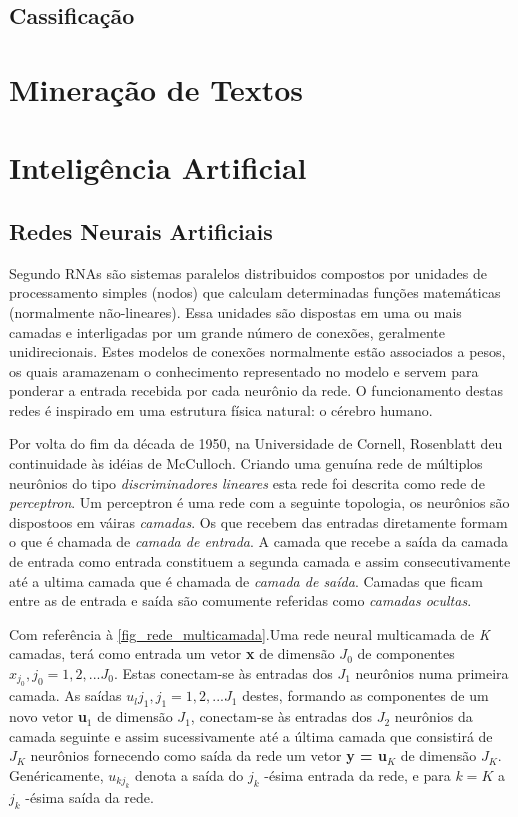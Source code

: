 \documentclass[
	12pt,				%
	openright,			%
	twoside,			%
	a4paper,			%
	english,			%
	french,				%
	spanish,			%
	brazil				%
	]{abntex2}
\begin{document}
\subsection{Cassificação}
\section{Mineração de Textos}
\section{Inteligência Artificial}
\subsection{Redes Neurais Artificiais}
Segundo  RNAs são sistemas paralelos distribuidos compostos por unidades de processamento simples (nodos) que calculam determinadas funções matemáticas (normalmente não-lineares). Essa unidades são dispostas em uma ou mais camadas e interligadas por um grande número de conexões, geralmente unidirecionais. Estes modelos de conexões normalmente estão associados a pesos, os quais aramazenam o conhecimento representado no modelo e servem para ponderar a entrada recebida por cada neurônio da rede. O funcionamento destas redes é inspirado em uma estrutura física natural: o cérebro humano.

Por volta do fim da década de 1950, na Universidade de Cornell, Rosenblatt deu continuidade às idéias de McCulloch. Criando uma genuína rede de múltiplos neurônios do tipo \emph{discriminadores lineares} esta rede foi descrita como rede de \emph{perceptron}. Um perceptron é uma rede com a seguinte topologia, os neurônios são dispostoos em váiras \emph{camadas}. Os que recebem das entradas diretamente formam o que é chamada de \emph{camada de entrada}. A camada que recebe a saída da camada de entrada como entrada constituem a segunda camada e assim consecutivamente até a ultima camada que é chamada de \emph{camada de saída}. Camadas que ficam entre as de entrada e saída são comumente referidas como \emph{camadas ocultas}.

Com referência à \autoref{fig_rede_multicamada}.Uma rede neural multicamada de \emph{K} camadas, terá como entrada um vetor \textbf{x} de dimensão $J_0$ de componentes $x_{j_0}, j_0 = 1,2, ... J_0$. Estas conectam-se às entradas dos $J_1$ neurônios numa primeira camada. As saídas $u_lj_1,j_1 = 1,2, ... J_1$ destes, formando as componentes de um novo vetor \textbf{u$_1$} de dimensão $J_1$, conectam-se às entradas dos $J_2$ neurônios da camada seguinte e assim sucessivamente até a última camada que consistirá de $J_K$ neurônios fornecendo como saída da rede um vetor \textbf{y = u$_K$} de dimensão $J_K$. Genéricamente, $u_{kj_k}$ denota a saída do $j_k$ -ésima entrada da rede, e para $k=K$ a $j_k$ -ésima saída da rede.\cite[p. 39--40]{kovacs2002redes}
\end{document}
